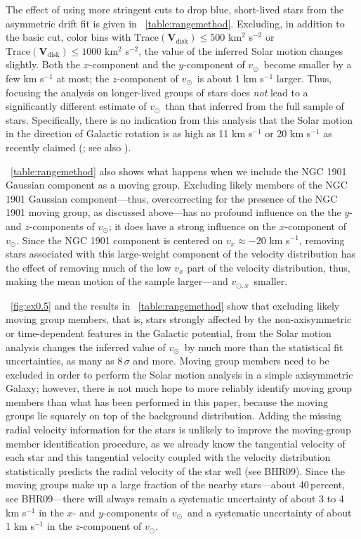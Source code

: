 \documentclass[12pt,preprint]{aastex}
\newcommand{\ten}[1]{\mathbf{#1}} %
\newcommand{\VV}{\ten{V}}
\newcommand{\trace}{\mathrm{Trace}}
\newcommand{\vsunlsr}{\ensuremath{v_\odot}}
\newcommand{\vsunlsrx}{\ensuremath{v_{\odot,x}}}
\newcommand{\bhr}{BHR09}
\newcommand{\VVdisk}{\VV_{\mathrm{\!disk}}}
\begin{document}
The effect of using more stringent cuts to drop blue, short-lived
stars from the asymmetric drift fit is given in
\tablename~\ref{table:rangemethod}. Excluding, in addition to the
basic cut, color bins with $\trace(\VVdisk) \leq 500$ km$^2$ s$^{-2}$
or $\trace(\VVdisk) \leq 1000$ km$^2$ s$^{-2}$, the value of the
inferred Solar motion changes slightly. Both the $x$-component and the
$y$-component of \vsunlsr\ become smaller by a few km s$^{-1}$ at
most; the $z$-component of \vsunlsr\ is about 1 km s$^{-1}$
larger. Thus, focusing the analysis on longer-lived groups of stars
does \emph{not} lead to a significantly different estimate of
\vsunlsr\ than that inferred from the full sample of
stars. Specifically, there is no indication from this analysis that
the Solar motion in the direction of Galactic rotation is as high as
11 km s$^{-1}$ or 20 km s$^{-1}$ as recently claimed
(\citealt{Binney09a,McMillan09a}; see also \citealt{Bovy09c}).

\tablename~\ref{table:rangemethod} also shows what happens when we
include the NGC 1901 Gaussian component as a moving group. Excluding
likely members of the NGC 1901 Gaussian component---thus,
overcorrecting for the presence of the NGC 1901 moving group, as
discussed above---has no profound influence on the the $y$- and
$z$-components of \vsunlsr; it does have a strong influence on the
$x$-component of \vsunlsr. Since the NGC 1901 component is centered on
$v_x \approx -20$ km s$^{-1}$, removing stars associated with this
large-weight component of the velocity distribution has the effect of
removing much of the low $v_x$ part of the velocity distribution,
thus, making the mean motion of the sample larger---and \vsunlsrx\
smaller.

\figurename~\ref{fig:ex0.5} and the results in
\tablename~\ref{table:rangemethod} show that excluding likely moving
group members, that is, stars strongly affected by the
non-axisymmetric or time-dependent features in the Galactic potential,
from the Solar motion analysis changes the inferred value of \vsunlsr\
by much more than the statistical fit uncertainties, as many as
$8\,\sigma$ and more. Moving group members need to be excluded in
order to perform the Solar motion analysis in a simple axisymmetric
Galaxy; however, there is not much hope to more reliably identify
moving group members than what has been performed in this paper,
because the moving groups lie squarely on top of the background
distribution.  Adding the missing radial velocity information for the
stars is unlikely to improve the moving-group member identification
procedure, as we already know the tangential velocity of each star and
this tangential velocity coupled with the velocity distribution
statistically predicts the radial velocity of the star well (see
\bhr). Since the moving groups make up a large fraction of the nearby
stars---about 40\,percent, see \bhr---there will always remain a
systematic uncertainty of about 3 to 4 km s$^{-1}$ in the $x$- and
$y$-components of \vsunlsr\ and a systematic uncertainty of about 1 km
s$^{-1}$ in the $z$-component of \vsunlsr.
\end{document}
